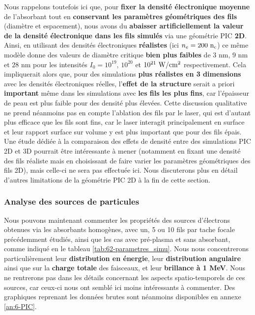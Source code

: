 \begin{refsection}
Nous rappelons toutefois ici que, pour \textbf{fixer la densité électronique moyenne} de l'absorbant tout en \textbf{conservant les paramètres géométriques des fils} (diamètre et espacement), nous avons du \textbf{abaisser artificiellement la valeur de la densité électronique dans les fils simulés} via une géométrie PIC \textbf{2D}. Ainsi, en utilisant des densités électroniques \textbf{réalistes} (ici $n_e = 200 ~ \rm n_c$) ce même modèle donne des valeurs de diamètre critique \textbf{bien plus faibles} de $3$ nm, $9$ nm et $28$ nm pour les intensités $I_0=10^{19}$, $10^{20}$ et $10^{21} ~ \rm W/cm^2$ respectivement. Cela impliquerait alors que, pour des simulations \textbf{plus réalistes en 3 dimensions} avec les densités électroniques réelles, l'\textbf{effet de la structure} serait a priori \textbf{important} même dans les simulations avec \textbf{les fils les plus fins}, car l'épaisseur de peau est plus faible pour des densité plus élevées. Cette discussion qualitative ne prend néanmoins pas en compte l'ablation des fils par le laser, qui est d'autant plus efficace que les fils sont fins, car le laser interagit principalement en surface et leur rapport surface sur volume y est plus important que pour des fils épais. Une étude dédiée à la comparaison des effets de densité entre des simulations PIC 2D et 3D pourrait être intéressante à mener (notamment en fixant une densité des fils réaliste mais en choisissant de faire varier les paramètres géométriques des fils 2D), mais celle-ci ne sera pas effectuée ici. Nous discuterons plus en détail d'autres limitations de la géométrie PIC 2D à la fin de cette section.

\subsubsection{Analyse des sources de particules}

Nous pouvons maintenant commenter les propriétés des sources d'électrons obtenues via les absorbants homogènes, avec un, 5 ou 10 fils par tache focale précédemment étudiés, ainsi que les cas avec pré-plasma et sans absorbant, comme indiqué en le tableau \ref{tab:62-parametres_simu}. Nous nous concentrerons particulièrement leur \textbf{distribution en énergie}, leur \textbf{distribution angulaire} ainsi que sur la \textbf{charge totale} des faisceaux, et leur \textbf{brillance à 1 MeV}. Nous ne rentrerons pas dans les détails concernant les aspects spatio-temporels de ces sources, car ceux-ci nous ont semblé ici moins intéressants à commenter. Des graphiques reprenant les données brutes sont néanmoins disponibles en annexe \ref{an:6-PIC}.


\end{refsection}
